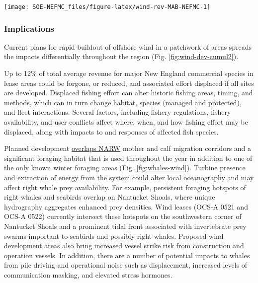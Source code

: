 \documentclass[
  10pt,
]{article}
\let\origfigure\figure
\let\endorigfigure\endfigure
\renewenvironment{figure}[1][2] {
    \expandafter\origfigure\expandafter[H]
} {
    \endorigfigure
}
\begin{document}
\begin{figure}

\texttt{[image: SOE-NEFMC\_files/figure-latex/wind-rev-MAB-NEFMC-1]} \hfill{}

\caption{Percent of Mid-Atlantic port revenue with majority NEFMC landings from Wind Energy Areas (WEA) in descending order from most to least port fisheries revenue from WEA.}\label{fig:wind-rev-MAB-NEFMC}
\end{figure}

\hypertarget{implications-6}{%
\subsubsection{Implications}\label{implications-6}}

Current plans for rapid buildout of offshore wind in a patchwork of areas spreads the impacts differentially throughout the region (Fig. \ref{fig:wind-dev-cumul2}).

Up to 12\% of total average revenue for major New England commercial species in lease areas could be forgone, or reduced, and associated effort displaced if all sites are developed. Displaced fishing effort can alter historic fishing areas, timing, and methods, which can in turn change habitat, species (managed and protected), and fleet interactions. Several factors, including fishery regulations, fishery availability, and user conflicts affect where, when, and how fishing effort may be displaced, along with impacts to and responses of affected fish species.

Planned development \href{https://noaa-edab.github.io/catalog/persistent_hotspots.html}{overlaps NARW} mother and calf migration corridors and a significant foraging habitat that is used throughout the year in addition to one of the only known winter foraging areas (Fig. \ref{fig:whales-wind}). Turbine presence and extraction of energy from the system could alter local oceanography and may affect right whale prey availability. For example, persistent foraging hotspots of right whales and seabirds overlap on Nantucket Shoals, where unique hydrography aggregates enhanced prey densities. Wind leases (OCS-A 0521 and OCS-A 0522) currently intersect these hotspots on the southwestern corner of Nantucket Shoals and a prominent tidal front associated with invertebrate prey swarms important to seabirds and possibly right whales. Proposed wind development areas also bring increased vessel strike risk from construction and operation vessels. In addition, there are a number of potential impacts to whales from pile driving and operational noise such as displacement, increased levels of communication masking, and elevated stress hormones.
\end{document}
